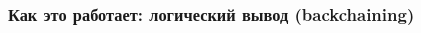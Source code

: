 \documentclass{beamer}
\begin{document}
\begin{frame}[fragile]
  \frametitle{Как это работает: логический вывод (backchaining)}
\begin{columns}
  \begin{column}{0.3\textwidth}
  \end{column}

  \begin{column}{0.3\textwidth}
  \end{column}

  \begin{column}{0.3\textwidth}
  \end{column}
\end{columns}

\vspace{1cm}

\begin{columns}
  \begin{column}{0.5\textwidth}
  \end{column}

  \begin{column}{0.4\textwidth}
  \end{column}

\end{columns}

\vspace{1cm}

\begin{columns}
  \begin{column}{0.5\textwidth}
  \end{column}

  \begin{column}{0.4\textwidth}
  \end{column}

\end{columns}
\end{frame}
\end{document}
